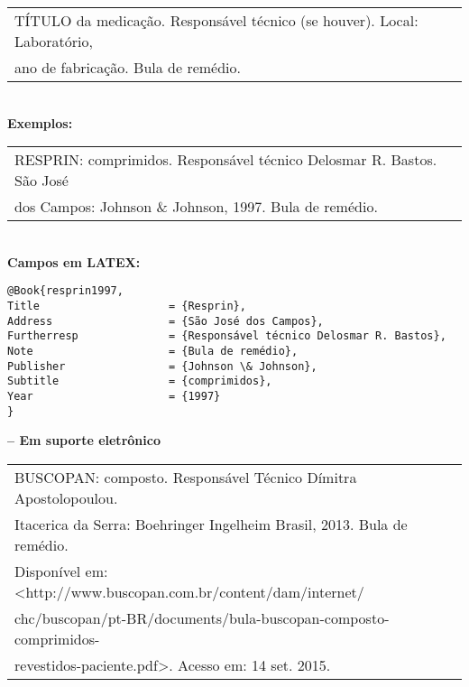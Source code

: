 \begin{tabular}{|l|c|} \hline
	TÍTULO da medicação. Responsável técnico (se houver). Local: Laboratório, \\ano de fabricação. Bula de remédio. 
	                                                                                \\\hline
\end{tabular} \\
	
\textbf{Exemplos:} \\
	
\begin{tabular}{|l|c|} \hline
	RESPRIN: comprimidos. Responsável técnico Delosmar R. Bastos. São José \\dos Campos: Johnson \& Johnson, 1997. Bula de remédio. 
	                                                                           \\\hline
\end{tabular} \\
	
\textbf{Campos em LATEX:} 
	
\begingroup
\fontsize{10pt}{12pt}\selectfont
\begin{verbatim}
@Book{resprin1997,
Title                    = {Resprin},
Address                  = {São José dos Campos},
Furtherresp              = {Responsável técnico Delosmar R. Bastos},
Note                     = {Bula de remédio},
Publisher                = {Johnson \& Johnson},
Subtitle                 = {comprimidos},
Year                     = {1997}
}
\end{verbatim}
\endgroup
	
\textbf{-- Em suporte eletrônico} \\
	
\begin{tabular}{|l|c|} \hline
	BUSCOPAN: composto. Responsável Técnico Dímitra Apostolopoulou. \\ Itacerica da Serra: Boehringer Ingelheim Brasil, 2013. Bula de remédio. \\Disponível em:<http://www.buscopan.com.br/content/dam/internet/\\chc/buscopan/pt-BR/documents/bula-buscopan-composto-comprimidos-\\revestidos-paciente.pdf>. Acesso em: 14 set. 2015.
	                                                                   \\\hline
\end{tabular} \\
	
